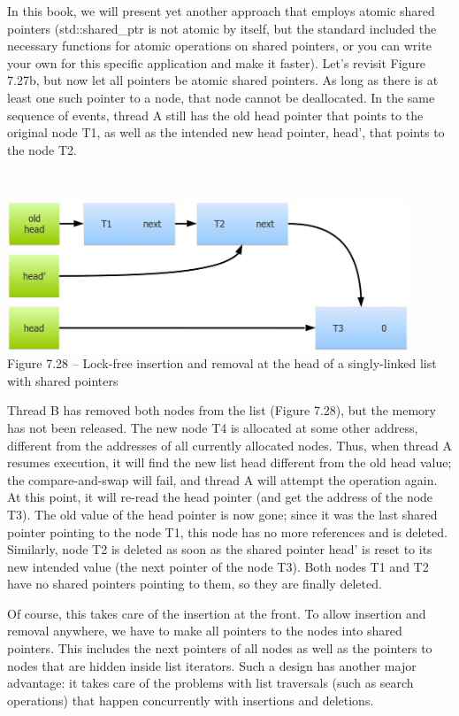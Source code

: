 In this book, we will present yet another approach that employs atomic shared pointers (std::shared\_ptr is not atomic by itself, but the standard included the necessary functions for atomic operations on shared pointers, or you can write your own for this specific application and make it faster). Let's revisit Figure 7.27b, but now let all pointers be atomic shared pointers. As long as there is at least one such pointer to a node, that node cannot be deallocated. In the same sequence of events, thread A still has the old head pointer that points to the original node T1, as well as the intended new head pointer, head', that points to the node T2. 

\hspace*{\fill} \\ %
\begin{center}
\includegraphics[width=0.9\textwidth]{content/2/chapter7/images/28.jpg}\\
Figure 7.28 – Lock-free insertion and removal at the head of a singly-linked list with shared pointers
\end{center}

Thread B has removed both nodes from the list (Figure 7.28), but the memory has not been released. The new node T4 is allocated at some other address, different from the addresses of all currently allocated nodes. Thus, when thread A resumes execution, it will find the new list head different from the old head value; the compare-and-swap will fail, and thread A will attempt the operation again. At this point, it will re-read the head pointer (and get the address of the node T3). The old value of the head pointer is now gone; since it was the last shared pointer pointing to the node T1, this node has no more references and is deleted. Similarly, node T2 is deleted as soon as the shared pointer head' is reset to its new intended value (the next pointer of the node T3). Both nodes T1 and T2 have no shared pointers pointing to them, so they are finally deleted. 

Of course, this takes care of the insertion at the front. To allow insertion and removal anywhere, we have to make all pointers to the nodes into shared pointers. This includes the next pointers of all nodes as well as the pointers to nodes that are hidden inside list iterators. Such a design has another major advantage: it takes care of the problems with list traversals (such as search operations) that happen concurrently with insertions and deletions.

